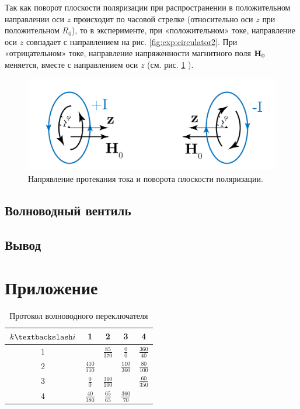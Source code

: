 Так как поворот плоскости поляризации при распространении в положительном направлении оси $z$ происходит по часовой
стрелке (относительно оси $z$ при положительном $R_0$), то в эксперименте, при «положительном» токе, направление оси $z$ совпадает с
направлением на рис. \ref{fig:exp:circulator2}. При «отрицательном» токе, направление напряженности магнитного поля
$\textbf{H}_0$ меняется, вместе с направлением оси $z$ (см. рис. \ref{fig:exp:circulator3} ).
\begin{figure}[h!]
    \centering
    \includegraphics[width = 0.7\linewidth]{imgs/circulator3.pdf}
    \caption{Напрявление протекания тока и поворота плоскости поляризации.}
    \label{fig:exp:circulator3}
\end{figure}
\subsection{Волноводный вентиль}

\subsection{Вывод}

\newpage
\section{Приложение}
\begin{table}[h!]
    \centering
    \begin{tabular}{|c|c|c|c|c|}
    \hline
     $k \textbackslash i$ & 1 & 2 & 3 & 4 \\ \hline
    1 & \cellcolor{black!70}  & $\frac{85}{370}$ & $\frac{0}{0}$& $\frac{360}{40}$  \\ \hline
    2 & $\frac{410}{110}$  &\cellcolor{black!70}   & $\frac{110}{360}$  & $\frac{80}{100}$  \\ \hline
    3 & $\frac{0}{0}$  & $\frac{360}{100}$  & \cellcolor{black!70}  &  $\frac{60}{350}$ \\ \hline
    4 & $\frac{40}{380}$  & $\frac{65}{65}$  & $\frac{360}{70}$  & \cellcolor{black!70} \\ \hline
    \end{tabular}
    \caption{Протокол волноводного переключателя}
    \label{tab:phaser}
    \end{table}


